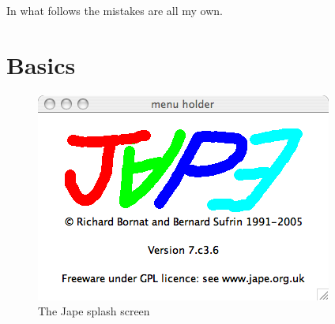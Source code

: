 \documentclass[11pt]{book}
\begin{document}
In what follows the mistakes are all my own.

\chapter{Basics}

\begin{figure}
\centering
\includegraphics[scale=0.5]{pics/splashscreen.png}
\caption{The Jape splash screen}
\label{fig:splashscreen}
\end{figure}
\end{document}
